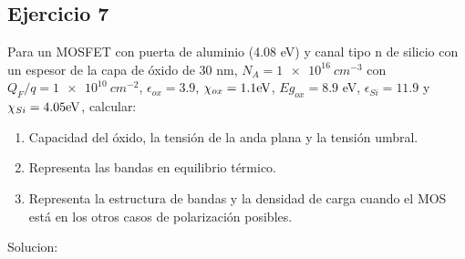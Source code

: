 \begin{Enunciado}
	\subsection*{Ejercicio 7}
	Para un MOSFET con puerta de aluminio (4.08 eV) y canal tipo n de silicio con un espesor de la capa de óxido de 30 nm, $N_A = \SI{1e16}{cm^{-3}}$ con $Q_F/q=\SI{1e10}{cm^{-2}}$, $\epsilon_{ox}=3.9$, $\chi_{ox}=1.1 \text{eV}$, $Eg_{ox}=8.9$ eV, $\epsilon_{Si} = 11.9$ y $\chi_{Si}=4.05 \text{eV}$, calcular:
	\begin{enumerate}[label=\alph*)]
		\item Capacidad del óxido, la tensión de la anda plana y la tensión umbral.
		\item Representa las bandas en equilibrio térmico.
		\item Representa la estructura de bandas y la densidad de carga cuando el MOS está en los otros casos de polarización posibles.
	\end{enumerate}
\end{Enunciado}
\vspace*{1em}
Solucion:
